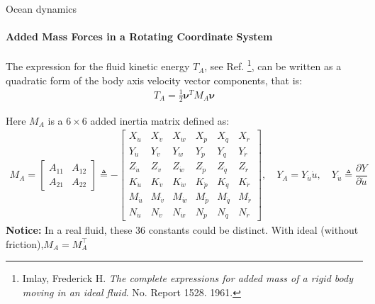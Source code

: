 \begin{frame}{Ocean dynamics}
	\framesubtitle{Added Mass Forces in a Rotating Coordinate System}
	The expression for the fluid kinetic energy \( T_A \), see Ref. \footnote{Imlay, Frederick H. \textit{The complete expressions for added mass of a rigid body moving in an ideal fluid}. No. Report 1528. 1961.}, can be written as a quadratic form of the body axis velocity vector components, that is:
	\begin{align}
		T_A = \frac{1}{2} \boldsymbol{\nu}^T M_A \boldsymbol{\nu}
	\end{align}
	
	Here \( M_A \) is a \( 6 \times 6 \) added inertia matrix defined as:
	\begin{align}
		M_A = 
		\begin{bmatrix}
			A_{11} & A_{12} \\
			A_{21} & A_{22}
		\end{bmatrix}
		\triangleq - 
		\begin{bmatrix}
			X_{\dot{u}} & X_{\dot{v}} & X_{\dot{w}} & X_{\dot{p}} & X_{\dot{q}} & X_{\dot{r}} \\
			Y_{\dot{u}} & Y_{\dot{v}} & Y_{\dot{w}} & Y_{\dot{p}} & Y_{\dot{q}} & Y_{\dot{r}} \\
			Z_{\dot{u}} & Z_{\dot{v}} & Z_{\dot{w}} & Z_{\dot{p}} & Z_{\dot{q}} & Z_{\dot{r}} \\
			K_{\dot{u}} & K_{\dot{v}} & K_{\dot{w}} & K_{\dot{p}} & K_{\dot{q}} & K_{\dot{r}} \\
			M_{\dot{u}} & M_{\dot{v}} & M_{\dot{w}} & M_{\dot{p}} & M_{\dot{q}} & M_{\dot{r}} \\
			N_{\dot{u}} & N_{\dot{v}} & N_{\dot{w}} & N_{\dot{p}} & N_{\dot{q}} & N_{\dot{r}}
		\end{bmatrix}, \quad Y_A = Y_{\dot{u}}\dot{u}, \quad Y_{\dot{u}} \triangleq \dfrac{\partial Y}{\partial \dot{u}}
	\end{align}
	\textbf{Notice:} In a real fluid, these 36 constants could be distinct. With ideal (without friction),$M_A = M_A^\top$
\end{frame}





